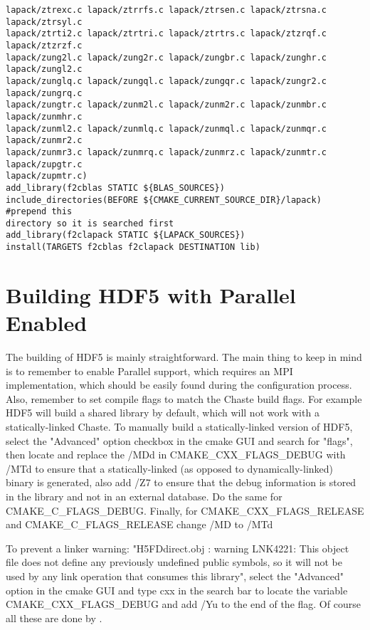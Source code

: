 \documentclass[10pt,a4paper]{article}
\begin{document}
\begin{codeparchment}
\begin{lstlisting}
lapack/ztrexc.c lapack/ztrrfs.c lapack/ztrsen.c lapack/ztrsna.c lapack/ztrsyl.c
lapack/ztrti2.c lapack/ztrtri.c lapack/ztrtrs.c lapack/ztzrqf.c lapack/ztzrzf.c
lapack/zung2l.c lapack/zung2r.c lapack/zungbr.c lapack/zunghr.c lapack/zungl2.c
lapack/zunglq.c lapack/zungql.c lapack/zungqr.c lapack/zungr2.c lapack/zungrq.c
lapack/zungtr.c lapack/zunm2l.c lapack/zunm2r.c lapack/zunmbr.c lapack/zunmhr.c
lapack/zunml2.c lapack/zunmlq.c lapack/zunmql.c lapack/zunmqr.c lapack/zunmr2.c
lapack/zunmr3.c lapack/zunmrq.c lapack/zunmrz.c lapack/zunmtr.c lapack/zupgtr.c
lapack/zupmtr.c)
add_library(f2cblas STATIC ${BLAS_SOURCES})
include_directories(BEFORE ${CMAKE_CURRENT_SOURCE_DIR}/lapack) #prepend this
directory so it is searched first
add_library(f2clapack STATIC ${LAPACK_SOURCES})
install(TARGETS f2cblas f2clapack DESTINATION lib)
\end{lstlisting}
\end{codeparchment}


\section{Building HDF5 with Parallel Enabled}

The building of HDF5 is mainly straightforward. The main thing to keep in mind
is to remember to enable Parallel support, which requires an MPI implementation,
which should be easily found during the configuration process. Also, remember to
set compile flags to match the Chaste build flags. For example HDF5 will build a
shared library by default, which will not work with a statically-linked Chaste.
To manually build a statically-linked version of HDF5, select the "Advanced"
option checkbox in the cmake GUI and search for "flags",
then locate and replace the /MDd in CMAKE\_CXX\_FLAGS\_DEBUG with /MTd to ensure
that a statically-linked (as opposed to dynamically-linked) binary is generated,
also
add /Z7 to ensure that the debug information is stored in the library and not in
an external database. Do the same for
CMAKE\_C\_FLAGS\_DEBUG. Finally, for CMAKE\_CXX\_FLAGS\_RELEASE and
CMAKE\_C\_FLAGS\_RELEASE change /MD to /MTd 

To prevent a linker warning: "H5FDdirect.obj : warning LNK4221: This object file
does not define any previously undefined public symbols, so it will not be used
by any link operation that consumes this library", select the "Advanced" option
in the cmake GUI and type cxx in the search bar to locate the variable
CMAKE\_CXX\_FLAGS\_DEBUG and add /Yu to the end of the flag. Of course all these
are done by \chastelibbuilder.
\end{document}
